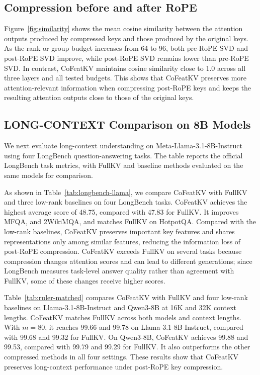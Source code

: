 \documentclass{article} %
\begin{document}
\subsection{Compression before and after RoPE}


Figure~\ref{fig:similarity} shows the mean cosine similarity between the attention outputs
produced by compressed keys and those produced by the original keys. As the
rank or group budget increases from 64 to 96, both pre-RoPE SVD and post-RoPE
SVD improve, while post-RoPE SVD remains lower than pre-RoPE SVD. In contrast,
CoFeatKV maintains cosine similarity close to 1.0 across all three layers and
all tested budgets. This shows that CoFeatKV preserves more attention-relevant
information when compressing post-RoPE keys and keeps the resulting attention
outputs close to those of the original keys.

\subsection{LONG-CONTEXT Comparison on 8B Models}

We next evaluate long-context understanding on Meta-Llama-3.1-8B-Instruct using four LongBench question-answering tasks. The table reports
the official LongBench task metrics, with FullKV and baseline methods evaluated
on the same models for comparison.

As shown in Table~\ref{tab:longbench-llama}, we compare CoFeatKV with FullKV
and three low-rank baselines on four LongBench tasks. CoFeatKV achieves the
highest average score of 48.75, compared with 47.83 for FullKV. It improves
 MFQA, and 2WikiMQA, and matches FullKV on HotpotQA. Compared with the
low-rank baselines, CoFeatKV preserves important key features and shares
representations only among similar features, reducing the information loss of
post-RoPE compression. CoFeatKV exceeds FullKV on several tasks
because compression changes attention scores and can lead to different
generations; since LongBench measures task-level answer quality rather than
agreement with FullKV, some of these changes receive higher scores.

Table~\ref{tab:ruler-matched} compares CoFeatKV with FullKV and four low-rank
baselines on Llama-3.1-8B-Instruct and Qwen3-8B at 16K and 32K context
lengths. CoFeatKV matches FullKV across both models and context lengths. With
$m=80$, it reaches 99.66 and 99.78 on Llama-3.1-8B-Instruct, compared with
99.68 and 99.32 for FullKV. On Qwen3-8B, CoFeatKV achieves 99.88 and 99.53,
compared with 99.79 and 99.29 for FullKV. It also outperforms the other
compressed methods in all four settings. These results show that CoFeatKV
preserves long-context performance under post-RoPE key compression.
\end{document}
